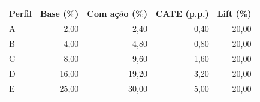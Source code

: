 \begin{tabular}{lrrrr}
\toprule
Perfil & Base (\%) & Com ação (\%) & CATE (p.p.) & Lift (\%) \\
\midrule
A & 2,00 & 2,40 & 0,40 & 20,00 \\
B & 4,00 & 4,80 & 0,80 & 20,00 \\
C & 8,00 & 9,60 & 1,60 & 20,00 \\
D & 16,00 & 19,20 & 3,20 & 20,00 \\
E & 25,00 & 30,00 & 5,00 & 20,00 \\
\bottomrule
\end{tabular}
